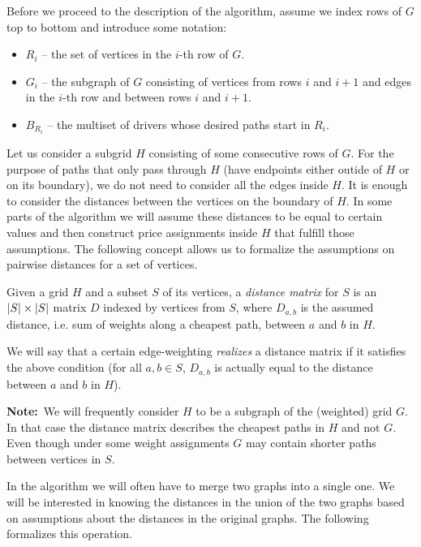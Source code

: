 Before we proceed to the description of the algorithm, assume we index rows of $G$ top to bottom and introduce some notation:
\begin{itemize}[nosep]
\item $R_i$ -- the set of vertices in the $i$-th row of $G$.
\item $G_i$ -- the subgraph of $G$ consisting of vertices from rows $i$ and $i+1$ and edges in the $i$-th row and between rows $i$ and $i+1$.
\item $B_{R_i}$ -- the multiset of drivers whose desired paths start in $R_i$.
\end{itemize}

Let us consider a subgrid $H$ consisting of some consecutive rows of $G$.
For the purpose of paths that only pass through $H$ (have endpoints either outide of $H$ or on its boundary),
we do not need to consider all the edges inside $H$.
It is enough to consider the distances between the vertices on the boundary of $H$.
In some parts of the algorithm we will assume these distances to be equal to certain values and
then construct price assignments inside $H$ that fulfill those assumptions.
The following concept allows us to formalize the assumptions on pairwise distances for a set of vertices.

\begin{definition}
    \label{def:distance_matrix}
    Given a grid $H$ and a subset $S$ of its vertices,
    a \emph{distance matrix} for $S$ is an $\left| S \right| \times \left| S \right|$ matrix $D$ indexed by vertices from $S$,
    where $D_{a, b}$ is the assumed distance, i.e. sum of weights along a cheapest path, between $a$ and $b$ in $H$.

    We will say that a certain edge-weighting \emph{realizes} a distance matrix if it satisfies the above condition
    (for all $a, b \in S$, $D_{a,b}$ is actually equal to the distance between $a$ and $b$ in $H$).

    \textbf{Note:}~We will frequently consider $H$ to be a subgraph of the (weighted) grid $G$.
    In that case the distance matrix describes the cheapest paths in $H$ and not $G$.
    Even though under some weight assignments $G$ may contain shorter paths between vertices in $S$.
\end{definition}

In the algorithm we will often have to merge two graphs into a single one.
We will be interested in knowing the distances in the union of the two graphs
based on assumptions about the distances in the original graphs.
The following formalizes this operation.

